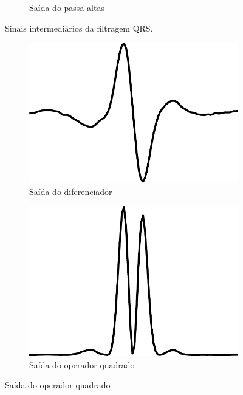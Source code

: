 \begin{figure}[ht]
\begin{subfigure}[b]{.3\textwidth}
        \caption{Saída do passa-altas}
    \end{subfigure}
    \caption[Sinais intermediários da filtragem QRS]{Sinais intermediários da filtragem QRS.}
    \label{fig:qrssignals1}
\end{figure}

\begin{figure}[ht]
    \centering
    \begin{subfigure}[b]{.3\textwidth}
        \includegraphics[width=\textwidth]{figures/chap6-differentiator.pdf}
        \caption{Saída do diferenciador}
    \end{subfigure}
    \begin{subfigure}[b]{.3\textwidth}
        \includegraphics[width=\textwidth]{figures/chap6-squaring.pdf}
        \caption{Saída do operador quadrado}
    \end{subfigure}

\end{figure}

